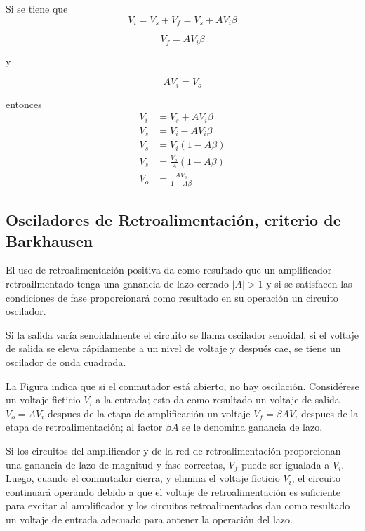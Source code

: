 \documentclass[12pt,letterpaper,titlepage,twoside]{book}
\begin{document}
Si se tiene que 
\begin{equation}
V_i = V_s+V_f = V_s+AV_i\beta
\end{equation}

\begin{equation}
V_f = A V_i \beta
\end{equation}

y 

\begin{equation}
AV_i = V_o
\end{equation}

entonces
\begin{align*}
V_i &= V_s +A V_i \beta\\
V_s &= V_i -AV_i\beta\\
V_s &= V_i \left( 1 - A\beta \right)\\
V_s &= \frac{V_o}{A}\left( 1 - A\beta \right)\\
V_o &=  \frac{AV_s}{1 - A\beta}
\end{align*}


\subsection{Osciladores de Retroalimentación, criterio de Barkhausen}
El uso de retroalimentación positiva da como resultado que un amplificador retroailmentado tenga una ganancia de lazo cerrado $\vert A \vert > 1$ y si se satisfacen las condiciones de fase proporcionará como resultado en su operación un circuito oscilador.

Si la salida varía senoidalmente el circuito se llama oscilador senoidal, si el voltaje de salida se eleva rápidamente a un nivel de voltaje y después cae, se tiene un oscilador de onda cuadrada.

La Figura indica que si el conmutador está abierto, no hay oscilación. Considérese un voltaje ficticio $V_i$ a la entrada; esto da como resultado un voltaje de salida $V_o = AV_i$ despues de la etapa de amplificación  un voltaje $V_f = \beta A V_i$ despues de la etapa de retroalimentación; al factor $\beta A$ se le denomina ganancia de lazo.

Si los circuitos del amplificador y de la red de retroalimentación  proporcionan una ganancia de lazo de magnitud y fase correctas, $V_f$ puede ser igualada a $V_i$. Luego, cuando el conmutador cierra, y elimina el voltaje ficticio $V_i$, el circuito continuará operando debido a que el voltaje de retroalimentación es suficiente para excitar al amplificador y los circuitos retroalimentados dan como resultado un voltaje de entrada adecuado para antener la operación del lazo.
\end{document}
